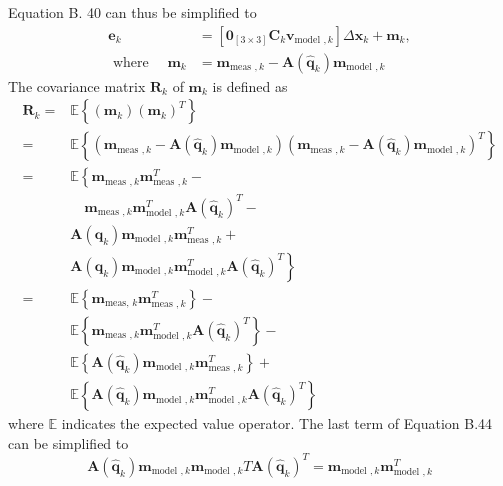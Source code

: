Equation B. 40 can thus be simplified to
$$
\begin{aligned}
\mathbf{e}_{k} &=\left[\mathbf{0}_{[3 \times 3]} \mathbf{C}_{k} \mathbf{v}_{\text {model }, k}\right] \Delta \mathbf{x}_{k}+\mathbf{m}_{k}, \\
\text { where } \quad \mathbf{m}_{k} &=\mathbf{m}_{\text {meas }, k}-\mathbf{A}\left(\hat{\mathbf{q}}_{k}\right) \mathbf{m}_{\text {model }, k}
\end{aligned}
$$
The covariance matrix $\mathbf{R}_{k}$ of $\mathbf{m}_{k}$ is defined as
$$
\begin{aligned}
\mathbf{R}_{k}=& \mathbb{E}\left\{\left(\mathbf{m}_{k}\right)\left(\mathbf{m}_{k}\right)^{T}\right\} \\
=& \mathbb{E}\left\{\left(\mathbf{m}_{\text {meas }, k}-\mathbf{A}\left(\hat{\mathbf{q}}_{k}\right) \mathbf{m}_{\text {model }, k}\right)\left(\mathbf{m}_{\text {meas }, k}-\mathbf{A}\left(\hat{\mathbf{q}}_{k}\right) \mathbf{m}_{\text {model }, k}\right)^{T}\right\} \\
=& \mathbb{E}\left\{\mathbf{m}_{\text {meas }, k} \mathbf{m}_{\text {meas }, k}^{T}-\right.\\
& \quad \mathbf{m}_{\text {meas }, k} \mathbf{m}_{\text {model }, k}^{T} \mathbf{A}\left(\hat{\mathbf{q}}_{k}\right)^{T}-\\
& \mathbf{A}\left(\hat{\mathbf{q}}_{k}\right) \mathbf{m}_{\text {model }, k} \mathbf{m}_{\text {meas }, k}^{T}+\\
&\left.\mathbf{A}\left(\hat{\mathbf{q}}_{k}\right) \mathbf{m}_{\text {model }, k} \mathbf{m}_{\text {model }, k}^{T} \mathbf{A}\left(\hat{\mathbf{q}}_{k}\right)^{T}\right\} \\
=& \mathbb{E}\left\{\mathbf{m}_{\text {meas, } k} \mathbf{m}_{\text {meas }, k}^{T}\right\}-\\
& \mathbb{E}\left\{\mathbf{m}_{\text {meas }, k} \mathbf{m}_{\text {model }, k}^{T} \mathbf{A}\left(\hat{\mathbf{q}}_{k}\right)^{T}\right\}-\\
& \mathbb{E}\left\{\mathbf{A}\left(\hat{\mathbf{q}}_{k}\right) \mathbf{m}_{\text {model }, k} \mathbf{m}_{\text {meas }, k}^{T}\right\}+\\
& \mathbb{E}\left\{\mathbf{A}\left(\hat{\mathbf{q}}_{k}\right) \mathbf{m}_{\text {model }, k} \mathbf{m}_{\text {model }, k}^{T} \mathbf{A}\left(\hat{\mathbf{q}}_{k}\right)^{T}\right\}
\end{aligned}
$$
where $\mathbb{E}$ indicates the expected value operator. The last term of Equation B.44 can be simplified to
$$
\mathbf{A}\left(\hat{\mathbf{q}}_{k}\right) \mathbf{m}_{\text {model }, k} \mathbf{m}_{\text {model }, k} T \mathbf{A}\left(\hat{\mathbf{q}}_{k}\right)^{T}=\mathbf{m}_{\text {model }, k} \mathbf{m}_{\text {model }, k}^{T}
$$
